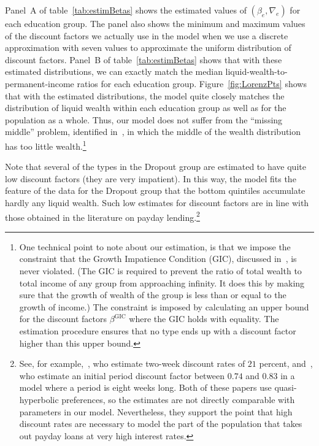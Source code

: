 \documentclass[\PathToRoot/\ProjectName]{subfiles}
\begin{document}
Panel~A of table~\ref{tab:estimBetas} shows the estimated values of $(\beta_e, \nabla_e)$ for each education group.
The panel also shows the minimum and maximum values of the discount factors we actually use in the model when we use a discrete approximation with seven values to approximate the uniform distribution of discount factors.
Panel~B of table~\ref{tab:estimBetas} shows that with these estimated distributions, we can exactly match the median liquid-wealth-to-permanent-income ratios for each education group.
Figure~\ref{fig:LorenzPts} shows that with the estimated distributions, the model quite closely matches the distribution of liquid wealth within each education group as well as for the population as a whole.
Thus, our model does not suffer from the ``missing middle'' problem, identified in~\cite{kaplanMPC2022}, in which the middle of the wealth distribution has too little wealth.\footnote{One technical point to note about our estimation, is that we impose the constraint that the Growth Impatience Condition (GIC), discussed in~\cite{carroll2022theoretical}, is never violated. (The GIC is required to prevent the ratio of total wealth to total income of any group from approaching infinity. It does this by making sure that the growth of wealth of the group is less than or equal to the growth of income.) The constraint is imposed by calculating an upper bound for the discount factors $\beta^{\text{GIC}}$ where the GIC holds with equality. The estimation procedure ensures that no type ends up with a discount factor higher than this upper bound.}



Note that several of the types in the Dropout group are estimated to have quite low discount factors (they are very impatient).
In this way, the model fits the feature of the data for the Dropout group that the bottom quintiles accumulate hardly any liquid wealth.
Such low estimates for discount factors are in line with those obtained in the literature on payday lending.\footnote{See, for example,~\cite{skiba2008payday}, who estimate two-week discount rates of $21$ percent, and~\cite{allcott2021high}, who estimate an initial period discount factor between $0.74$ and $0.83$ in a model where a period is eight weeks long.
  Both of these papers use quasi-hyperbolic preferences, so the estimates are not directly comparable with parameters in our model.
  Nevertheless, they support the point that high discount rates are necessary to model the part of the population that takes out payday loans at very high interest rates.}
\end{document}
